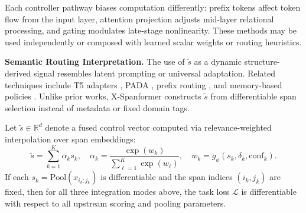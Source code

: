 Each controller pathway biases computation differently: prefix tokens affect token flow from the input layer, attention projection adjusts mid-layer relational processing, and gating modulates late-stage nonlinearity. These methods may be used independently or composed with learned scalar weights or routing heuristics.

\vspace{0.5em}
\noindent\textbf{Semantic Routing Interpretation.}
The use of \(\tilde{s}\) as a dynamic structure-derived signal resembles latent prompting or universal adaptation. Related techniques include T5 adapters \cite{raffel2020exploring}, PADA \cite{liu2022pada}, prefix routing \cite{gupta2022molt}, and memory-based policies \cite{rae2021scaling}. Unlike prior works, X-Spanformer constructs \(\tilde{s}\) from differentiable span selection instead of metadata or fixed domain tags.

\vspace{1.2em}
\begin{proposition}
\label{prop:controller_diff}
Let \(\tilde{s} \in \mathbb{R}^d\) denote a fused control vector computed via relevance-weighted interpolation over span embeddings:
\[
\tilde{s} = \sum_{k=1}^K \alpha_k s_k, \quad \alpha_k = \frac{\exp(w_k)}{\sum_{\ell=1}^K \exp(w_\ell)}, \quad w_k = g_\phi(s_k, \delta_k, \mathrm{conf}_k).
\]
If each \(s_k = \mathrm{Pool}(x_{i_k:j_k})\) is differentiable and the span indices \((i_k, j_k)\) are fixed, then for all three integration modes above, the task loss \(\mathcal{L}\) is differentiable with respect to all upstream scoring and pooling parameters.
\end{proposition}

